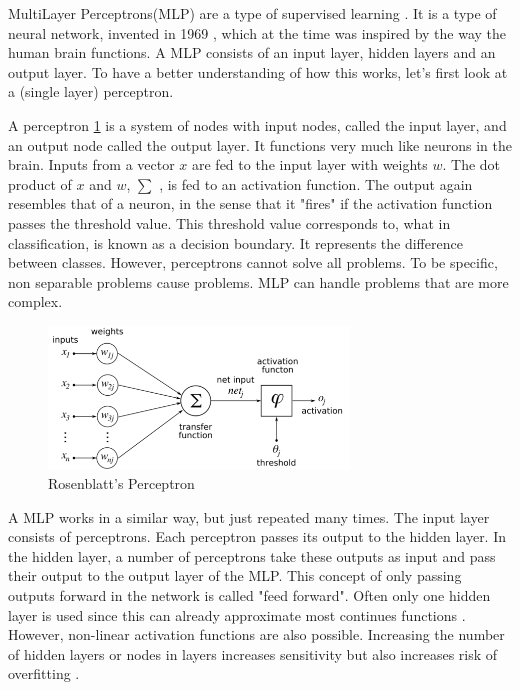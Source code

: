 MultiLayer Perceptrons(MLP) are a type of supervised learning \cite{michie1994machine}. It is a type of neural network, invented in 1969 \cite{minsky1969perceptions}, which at the time  was inspired by the way the human brain functions. A MLP consists of an input layer, hidden layers and an output layer. To have a better understanding of how this works, let's first look at a (single layer) perceptron\cite{rosenblatt1958perceptron}. 

A perceptron \ref{fig:perceptron} is a system of nodes with input nodes, called the input layer, and an output node called the output layer. It functions very much like neurons in the brain. Inputs from a vector $x$ are fed to the input layer with weights $w$. The dot product of $x$ and $w$, $\sum$ ,  is fed to an activation function. The output again resembles that of a neuron, in the sense that it "fires" if the activation function passes the threshold value. This threshold value corresponds to, what in classification, is known as a decision boundary. It represents the difference between classes. However, perceptrons cannot solve all problems. To be specific, non separable problems cause problems. MLP can handle problems that are more complex. \\
\begin{figure}[H]
    \includegraphics[width=80mm]{./img/perceptron.png}
    \caption{Rosenblatt's Perceptron \cite{wikiPerceptronPNG}}
    \label{fig:perceptron}
\end{figure}

A MLP works in a similar way, but just repeated many times. The input layer consists of perceptrons. Each perceptron passes its output to the hidden layer. In the hidden layer, a number of perceptrons take these outputs as input and pass their output to the output layer of the MLP. This concept of only passing outputs forward in the network is called "feed forward". Often only one hidden layer is used since this can already approximate most continues functions \cite{cybenko1989approximation}. However, non-linear activation functions are also possible. Increasing the number of hidden layers or nodes in layers increases sensitivity but also increases risk of overfitting \cite{Murtagh1991183}.

